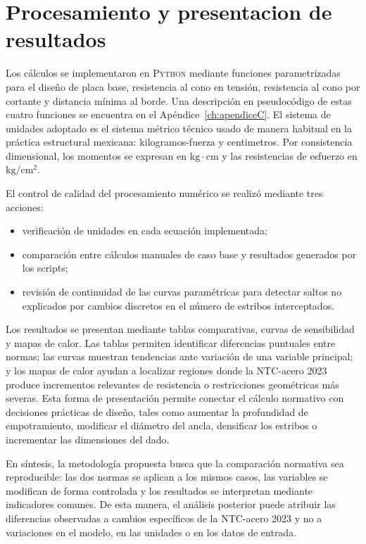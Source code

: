 \section{Procesamiento y presentacion de resultados}

Los cálculos se implementaron en \textsc{Python} mediante funciones parametrizadas para el diseño
de placa base, resistencia al cono en tensión, resistencia al cono por cortante y distancia mínima
al borde. Una descripción en pseudocódigo de estas cuatro funciones se encuentra en el
Apéndice~\ref{ch:apendiceC}. El sistema de unidades adoptado es el sistema métrico técnico usado
de manera habitual en la práctica estructural mexicana: kilogramos-fuerza y centimetros. Por
consistencia dimensional, los momentos se expresan en $\mathrm{kg{\cdot}cm}$ y las resistencias de
esfuerzo en $\mathrm{kg/cm^2}$.

El control de calidad del procesamiento numérico se realizó mediante tres acciones:

\begin{itemize}
  \item verificación de unidades en cada ecuación implementada;
  \item comparación entre cálculos manuales de caso base y resultados generados por los scripts;
  \item revisión de continuidad de las curvas paramétricas para detectar saltos no explicados por
    cambios discretos en el número de estribos interceptados.
\end{itemize}

Los resultados se presentan mediante tablas comparativas, curvas de sensibilidad y mapas de calor.
Las tablas permiten identificar diferencias puntuales entre normas; las curvas muestran tendencias
ante variación de una variable principal; y los mapas de calor ayudan a localizar regiones donde la
NTC-acero 2023 produce incrementos relevantes de resistencia o restricciones geométricas más
severas. Esta forma de presentación permite conectar el cálculo normativo con decisiones prácticas
de diseño, tales como aumentar la profundidad de empotramiento, modificar el diámetro del ancla,
densificar los estribos o incrementar las dimensiones del dado.

En síntesis, la metodología propuesta busca que la comparación normativa sea reproducible: las dos
normas se aplican a los mismos casos, las variables se modifican de forma controlada y los
resultados se interpretan mediante indicadores comunes. De esta manera, el análisis posterior puede
atribuir las diferencias observadas a cambios específicos de la NTC-acero 2023 y no a variaciones en
el modelo, en las unidades o en los datos de entrada.

